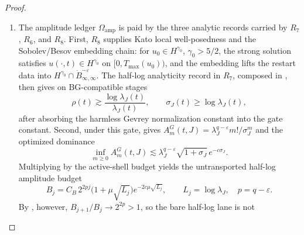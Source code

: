 \documentclass[11pt]{article}
\newcommand{\eps}{\varepsilon}
\newcommand{\Tmax}{T_{\max}}
\newcommand{\Omamp}{\Omega_{\mathrm{amp}}}
\newcommand{\sigmaJ}{\sigma_J}
\newcommand{\lambdaJ}{\lambda_J}
\theoremstyle{definition}
\begin{document}
\begin{proof}
\begin{enumerate}[label=\emph{Step \arabic*.}]
bad-overlap masks as amplitude-layer discharges without a quantitative
amplitude bridge, while  rules out
geometric-metric reweightings of \(\Omamp\) unless the normalized
metric dominates the fixed BG/BKM amplitude on the carrier scale.
 excludes moving-support data alone
as a closure record without a finite-termination, fixed-ledger, or
exhaustive-ledger squeeze.  Finally,
 rules out the half-log
analyticity lane alone as a discharge of \(\Omamp\), since the staged
budget has ratio tending to \(2^{2p}>1\), and
 records the corresponding
\(\sqrt{\log\lambdaJ}\) shortfall on the direct route; by the same
type discipline as NG2,  rules out
raw nonlinear observables such as fluxes, pressure interactions, and
triad terms as Schur probes.  Thus NG2--NG10 exclude all earlier
terminations of the cascade by public-shadow, marker, metric,
moving-window, endpoint-only, or nonlinear shortcuts.  The
undischarged ledger after the sieve is necessarily \(\Omamp\), whose
payment must come from the linear native probes admitted at the
amplitude layer, namely the analytic records treated in Step~4.
\item The amplitude ledger \(\Omamp\) is paid by the three analytic
records carried by \(R_7\), \(R_6\), and \(R_8\).  First, \(R_8\)
supplies Kato local well-posedness and the Sobolev/Besov embedding
chain: for \(u_0\in H^{\gamma_0}\), \(\gamma_0>5/2\), the strong
solution satisfies \(u(\cdot,t)\in H^{\gamma_0}\) on
\([0,\Tmax(u_0))\), and the embedding lifts the restart data into
\(H^{\gamma_0}\cap\dot B^{-\eps}_{\infty,\infty}\).  The half-log
analyticity record in \(R_7\), composed in
, then gives on
BG-compatible stages
\[
  \rho(t)\gtrsim \frac{\log\lambdaJ(t)}{\lambdaJ(t)},
  \qquad
  \sigmaJ(t)\geq \log\lambdaJ(t),
\]
after absorbing the harmless Gevrey normalization constant into the
gate constant.  Second, under this gate,
 gives
\(A_m^G(t,J)=\lambdaJ^{q-\eps}m!/\sigmaJ^m\) and the optimized
dominance
\[
  \inf_{m\geq 0} A_m^G(t,J)
  \lesssim
  \lambdaJ^{q-\eps}\sqrt{1+\sigmaJ}\,e^{-c\sigmaJ}.
\]
Multiplying by the active-shell budget yields the untransported
half-log amplitude budget
\[
  B_j
  =
  C_B\,2^{2pj}\bigl(1+\mu\sqrt{L_j}\bigr)
  e^{-2c\mu\sqrt{L_j}},
  \qquad
  L_j=\log\lambdaJ,\quad p=q-\eps .
\]
By , however,
\(B_{j+1}/B_j\to 2^{2p}>1\), so the bare half-log lane is not

\end{enumerate}
\end{proof}
\end{document}
